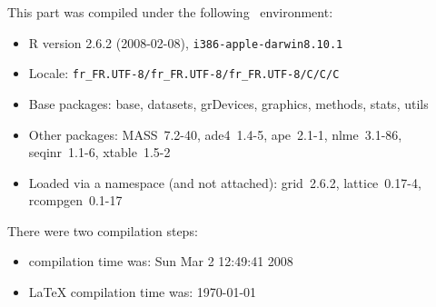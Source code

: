 \documentclass{article}
\begin{document}
This part was compiled under the following \Rlogo{}~environment:

\begin{itemize}
  \item R version 2.6.2 (2008-02-08), \verb|i386-apple-darwin8.10.1|
  \item Locale: \verb|fr_FR.UTF-8/fr_FR.UTF-8/fr_FR.UTF-8/C/C/C|
  \item Base packages: base, datasets, grDevices, graphics, methods,
    stats, utils
  \item Other packages: MASS~7.2-40, ade4~1.4-5, ape~2.1-1,
    nlme~3.1-86, seqinr~1.1-6, xtable~1.5-2
  \item Loaded via a namespace (and not attached): grid~2.6.2,
    lattice~0.17-4, rcompgen~0.1-17
\end{itemize}
There were two compilation steps:

\begin{itemize}
  \item \Rlogo{} compilation time was: Sun Mar  2 12:49:41 2008
  \item \LaTeX{} compilation time was: \today
\end{itemize}


\clearpage
{}


\end{document}
